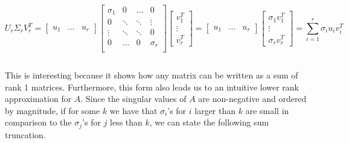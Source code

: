 \documentclass[a4paper]{article}
\begin{document}




$$
U_r \Sigma_r V_r^T = 
\begin{bmatrix}
u_1 & \dots & u_r
\end{bmatrix}
\begin{bmatrix}
    \sigma_1 & 0 & \dots  & 0 \\
    0 & \ddots & \ddots & \vdots\\
    \vdots & \ddots & \ddots & 0\\
    0 & \hdots & 0 & \sigma_r\\
\end{bmatrix}
\begin{bmatrix}
v_1^T\\ \vdots \\ v_r^T
\end{bmatrix}
=
\begin{bmatrix}
u_1 & \dots & u_r
\end{bmatrix}
\begin{bmatrix}
\sigma_1 v_1^T\\ \vdots \\ \sigma_r v_r^T
\end{bmatrix}
=
\sum_{i=1}^r \sigma_i u_i v_i^T
$$

$$
$$

This is interesting because it shows how any matrix can be written as a sum of rank 1 matrices.  Furthermore, this form also leads us to an intuitive lower rank approximation for $A$.  Since the singular values of $A$ are non-negative and ordered by magnitude, if for some $k$ we have that $\sigma_i$'s for $i$ larger than $k$ are small in comparison to the $\sigma_j$'s for $j$ less than $k$, we can state the following sum truncation.
\end{document}
